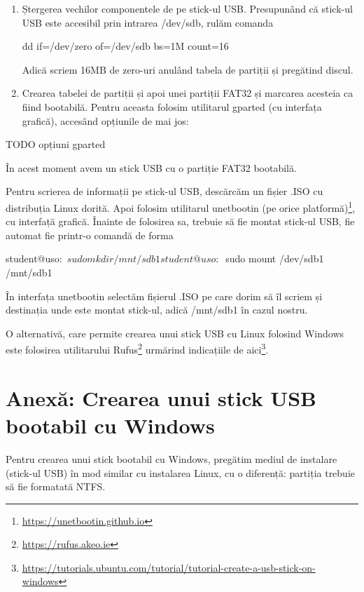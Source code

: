 \begin{enumerate}
	\item Ștergerea vechilor componentele de pe stick-ul USB. Presupunând că
		stick-ul USB este accesibil prin intrarea /dev/sdb, rulăm
		comanda

\begin{screen}
dd if=/dev/zero of=/dev/sdb bs=1M count=16
\end{screen}

Adică scriem 16MB de zero-uri anulând tabela de partiții și pregătind discul.

	\item Crearea tabelei de partiții și apoi unei partiții FAT32 și
		marcarea acesteia ca fiind bootabilă. Pentru aceasta folosim
		utilitarul gparted (cu interfața grafică), accesând opțiunile de
		mai jos:

\end{enumerate}

TODO opțiuni gparted

În acest moment avem un stick USB cu o partiție FAT32 bootabilă.

Pentru scrierea de informații pe stick-ul USB, descărcăm un fișier .ISO
 cu distribuția
Linux dorită. Apoi folosim utilitarul unetbootin (pe orice
platformă)\footnote{\url{https://unetbootin.github.io}}, cu interfață grafică.
Înainte de folosirea sa, trebuie să fie montat stick-ul USB, fie automat fie
printr-o comandă de forma

\begin{screen}
student@uso:~$ sudo mkdir /mnt/sdb1
student@uso:~$ sudo mount /dev/sdb1 /mnt/sdb1
\end{screen}

În interfața unetbootin selectăm fișierul .ISO pe care dorim să îl scriem și
destinația unde este montat stick-ul, adică /mnt/sdb1 în cazul nostru.

O alternativă, care permite crearea unui stick USB cu Linux folosind Windows
este folosirea utilitarului Rufus\footnote{\url{https://rufus.akeo.ie}} urmărind
indicațiile de
aici\footnote{\url{https://tutorials.ubuntu.com/tutorial/tutorial-create-a-usb-stick-on-windows}}.

\section{Anexă: Crearea unui stick USB bootabil cu Windows}
\label{sec:boot-usb-win}

Pentru crearea unui stick bootabil cu Windows, pregătim mediul de instalare
(stick-ul USB) în mod similar cu instalarea Linux, cu o diferență: partiția
trebuie să fie formatată NTFS.

